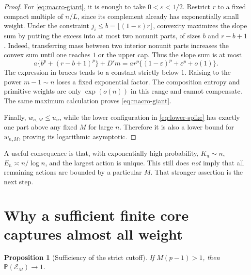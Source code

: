 \documentclass[11pt,a4paper]{article}
\numberwithin{equation}{section}
\newtheorem{proposition}[theorem]{Proposition}
\theoremstyle{definition}
\theoremstyle{remark}
\newcommand{\Prob}{\mathbb P}\newcommand{\E}{\mathbb E}
\newcommand{\One}{\mathcal E_M}
\begin{document}
\begin{proof}
For \eqref{eq:macro-giant}, it is enough to take $0<\varepsilon<1/2$.
Restrict $r$ to a fixed compact multiple of $n/L$, since its complement
already has exponentially small weight. Under the constraint
$j_i\le b=\lfloor(1-\varepsilon)r\rfloor$, convexity maximizes the slope
sum by putting the excess into at most two nonunit parts, of sizes $b$
and $r-b+1$. Indeed, transferring mass between two interior nonunit parts
increases the convex sum until one reaches $1$ or the upper cap.
Thus the slope sum is at most
\[
 a\{b^p+(r-b+1)^p\}+D'm
 =a r^p\{(1-\varepsilon)^p+\varepsilon^p+o(1)\}.
\]
The expression in braces tends to a constant strictly below $1$. Raising
to the power $m-1\sim n$ loses a fixed exponential factor. The
composition entropy and primitive weights are only $\exp(o(n))$ in this
range and cannot compensate. The same maximum calculation proves
\eqref{eq:macro-giant}.

Finally, $w_{n,M}\le u_n$, while the lower configuration in
\eqref{eq:lower-spike} has exactly one part above any fixed $M$ for large
$n$. Therefore it is also a lower bound for $w_{n,M}$, proving its
logarithmic asymptotic.
\end{proof}

A useful consequence is that, with exponentially high probability,
$K_n\sim n$, $E_n\asymp n/\log n$, and the largest action is unique.
This still does \emph{not} imply that all remaining actions are bounded
by a particular $M$. That stronger assertion is the next step.

\section{Why a sufficient finite core captures almost all weight}
\label{sec:cutoff-proof}

\begin{proposition}[Sufficiency of the strict cutoff]
\label{prop:sufficiency}
If $M(p-1)>1$, then $\Prob(\One)\to1$.
\end{proposition}
\end{document}
